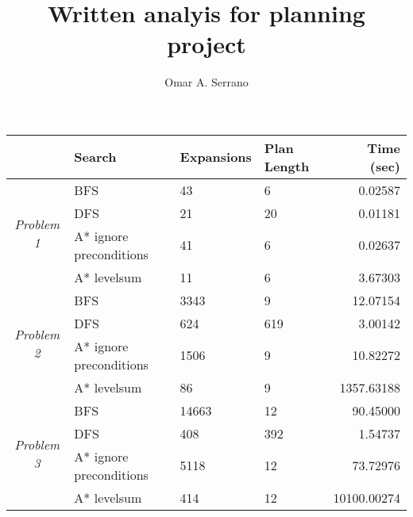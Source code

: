 \documentclass[10pt,a4paper]{article}
\title{Written analyis for planning project}
\author{Omar A. Serrano}
\begin{document}
\maketitle

\begin{tabular}{|c|l|l|l|r|}
    \hline
    & \textbf{Search} & \textbf{Expansions} & \textbf{Plan Length} & \textbf{Time (sec)} \\
    \hline
    \multirow{4}{*}{\textit{Problem 1}} & BFS & 43 & 6 & 0.02587 \\
    \cline{2-5}
    & DFS & 21 & 20 & 0.01181 \\
    \cline{2-5}
    & A* ignore preconditions & 41 & 6 & 0.02637 \\
    \cline{2-5}
    & A* levelsum & 11 & 6 & 3.67303 \\
    \hline
    \multirow{4}{*}{\textit{Problem 2}} & BFS & 3343 & 9 & 12.07154 \\
    \cline{2-5}
    & DFS & 624 & 619 & 3.00142 \\
    \cline{2-5}
    & A* ignore preconditions & 1506 & 9 & 10.82272 \\
    \cline{2-5}
    & A* levelsum & 86 & 9 & 1357.63188 \\
    \hline
    \multirow{4}{*}{\textit{Problem 3}} & BFS & 14663 & 12 & 90.45000 \\
    \cline{2-5}
    & DFS & 408 & 392 & 1.54737 \\
    \cline{2-5}
    & A* ignore preconditions & 5118 & 12 & 73.72976 \\
    \cline{2-5}
    & A* levelsum & 414 & 12 & 10100.00274 \\
    \hline
\end{tabular}
\end{document}
